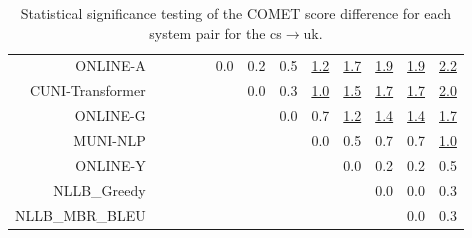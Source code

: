 \documentclass[11pt]{article}
\begin{document}
\begin{sidewaystable}
\begin{center}
{\begin{tabular}{rcccccccccccc}
ONLINE-A &    &  &  &  & \cellcolor{red!0} 0.0 & \cellcolor{red!0} 0.2 & \cellcolor{red!70} 0.5 & \cellcolor{red!70} \underline{1.2} & \cellcolor{red!70} \underline{1.7} & \cellcolor{red!70} \underline{1.9} & \cellcolor{red!70} \underline{1.9} & \cellcolor{red!70} \underline{2.2}\\ 
CUNI-Transformer &   &  &  &  &  & \cellcolor{red!0} 0.0 & \cellcolor{red!10} 0.3 & \cellcolor{red!70} \underline{1.0} & \cellcolor{red!70} \underline{1.5} & \cellcolor{red!70} \underline{1.7} & \cellcolor{red!70} \underline{1.7} & \cellcolor{red!70} \underline{2.0}\\ 
ONLINE-G &  &    &  &  &  &  & \cellcolor{red!0} 0.0 & \cellcolor{red!70} 0.7 & \cellcolor{red!70} \underline{1.2} & \cellcolor{red!70} \underline{1.4} & \cellcolor{red!70} \underline{1.4} & \cellcolor{red!70} \underline{1.7}\\ 
MUNI-NLP &   &  &  &  &  &  &  & \cellcolor{red!0} 0.0 & \cellcolor{red!40} 0.5 & \cellcolor{red!60} 0.7 & \cellcolor{red!70} 0.7 & \cellcolor{red!70} \underline{1.0}\\ 
ONLINE-Y &  &    &  &  &  &  &  &  & \cellcolor{red!0} 0.0 & \cellcolor{red!0} 0.2 & \cellcolor{red!0} 0.2 & \cellcolor{red!50} 0.5\\ 
NLLB\_Greedy &    &  &  &  &  &  &  &  &  & \cellcolor{red!0} 0.0 & \cellcolor{red!0} 0.0 & \cellcolor{red!0} 0.3\\ 
NLLB\_MBR\_BLEU &    &  &  &  &  &  &  &  &  &  & \cellcolor{red!0} 0.0 & \cellcolor{red!0} 0.3\\ 
\bottomrule 
\end{tabular} }
\caption{Statistical significance testing of the COMET score difference for each system pair for the cs$\rightarrow$uk.} 
 \end{center} \end{sidewaystable} 
\end{document}
